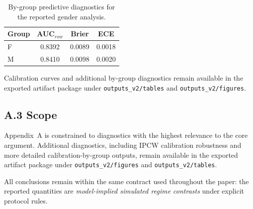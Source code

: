 \begin{table}[!t]
\centering
\caption{By-group predictive diagnostics for the reported gender analysis.}
\label{tab:app_group_metrics}
\begin{tabular}{lccc}
\hline
Group & AUC$_{row}$ & Brier & ECE \\
\hline
F & 0.8392 & 0.0089 & 0.0018 \\
M & 0.8410 & 0.0098 & 0.0020 \\
\hline
\end{tabular}
\end{table}

Calibration curves and additional by-group diagnostics remain available in the exported artifact package under \texttt{outputs\_v2/tables} and \texttt{outputs\_v2/figures}.

\subsection{A.3 Scope}

Appendix~A is constrained to diagnostics with the highest relevance to the core argument. Additional diagnostics, including IPCW calibration robustness and more detailed calibration-by-group outputs, remain available in the exported artifact package under \texttt{outputs\_v2/figures} and \texttt{outputs\_v2/tables}.

All conclusions remain within the same contract used throughout the paper: the reported quantities are \textit{model-implied simulated regime contrasts} under explicit protocol rules.